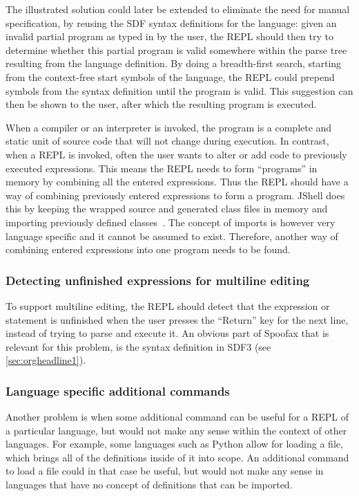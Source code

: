 The illustrated solution could later be extended to eliminate the need for
manual specification, by reusing the SDF syntax definitions for the language:
given an invalid partial program as typed in by the user, the REPL should then
try to determine whether this partial program is valid somewhere within the
parse tree resulting from the language definition. By doing a breadth-first
search, starting from the context-free start symbols of the language, the REPL
could prepend symbols from the syntax definition until the program is valid.
This suggestion can then be shown to the user, after which the resulting
program is executed.

When a compiler or an interpreter is invoked, the program is a complete and
static unit of source code that will not change during execution. In contrast,
when a REPL is invoked, often the user wants to alter or add code to previously
executed expressions. This means the REPL needs to form ``programs'' in memory
by combining all the entered expressions.  Thus the REPL should have a way of
combining previously entered expressions to form a program. JShell does this by
keeping the wrapped source and generated class files in memory and importing
previously defined classes~\cite{jshell-repl}. The concept of imports is
however very language specific and it cannot be assumed to exist.  Therefore,
another way of combining entered expressions into one program needs to be
found.

\subsubsection{Detecting unfinished expressions for multiline editing}
\label{sec:detect-unfin-expr}
To support multiline editing, the REPL should detect that the
expression or statement is unfinished when the user presses the
``Return'' key for the next line, instead of trying to parse and
execute it. An obvious part of Spoofax that is relevant for this
problem, is the syntax definition in SDF3 (see
\cref{sec:orgheadline1}).

\subsubsection{Language specific additional commands}
\label{sec:lang-spec-addit}
Another problem is when some additional command can be useful for a
REPL of a particular language, but would not make any sense within the
context of other languages. For example, some languages such as Python
allow for loading a file, which brings all of the definitions inside
of it into scope. An additional command to load a file could in that
case be useful, but would not make any sense in languages that have no
concept of definitions that can be imported.

